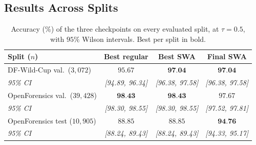 \documentclass[10pt,journal]{IEEEtran}
\newcommand{\best}[1]{\textbf{#1}}
\begin{document}
\subsection{Results Across Splits}
\begin{table}[!tb]
\caption{Accuracy (\%) of the three checkpoints on every evaluated split, at
$\tau=0.5$, with $95\%$ Wilson intervals. Best per split in bold.}
\label{tab:main}
\centering
\footnotesize
\setlength{\tabcolsep}{2.4pt}
\begin{tabular}{@{}lccc@{}}
\toprule
Split ($n$) & Best regular & Best SWA & Final SWA \\
\midrule
DF-Wild-Cup val.\ ($3{,}072$)
  & $95.67$ & $\best{97.04}$ & $\best{97.04}$ \\
\emph{95\% CI}
  & \emph{[94.89, 96.34]} & \emph{[96.38, 97.58]} & \emph{[96.38, 97.58]} \\[2pt]
OpenForensics val.\ ($39{,}428$)
  & $\best{98.43}$ & $\best{98.43}$ & $97.67$ \\
\emph{95\% CI}
  & \emph{[98.30, 98.55]} & \emph{[98.30, 98.55]} & \emph{[97.52, 97.81]} \\[2pt]
OpenForensics test ($10{,}905$)
  & $88.85$ & $88.85$ & $\best{94.76}$ \\
\emph{95\% CI}
  & \emph{[88.24, 89.43]} & \emph{[88.24, 89.43]} & \emph{[94.33, 95.17]} \\
\bottomrule
\end{tabular}
\end{table}
\end{document}
